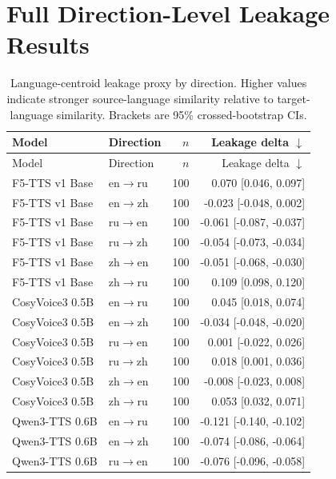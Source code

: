 \documentclass[11pt]{article}
\begin{document}
\FloatBarrier

\appendix

\section{Full Direction-Level Leakage Results}
\label{app:leakage_directions}

\begin{longtable}{llrr}
\caption{Language-centroid leakage proxy by direction. Higher values indicate stronger source-language similarity relative to target-language similarity. Brackets are 95\% crossed-bootstrap CIs.}
\label{tab:leakage_directions}\\
\toprule
Model & Direction & $n$ & Leakage delta $\downarrow$ \\
\midrule
\endfirsthead
\toprule
Model & Direction & $n$ & Leakage delta $\downarrow$ \\
\midrule
\endhead
F5-TTS v1 Base & en$\rightarrow$ru & 100 & 0.070 [0.046, 0.097] \\
F5-TTS v1 Base & en$\rightarrow$zh & 100 & -0.023 [-0.048, 0.002] \\
F5-TTS v1 Base & ru$\rightarrow$en & 100 & -0.061 [-0.087, -0.037] \\
F5-TTS v1 Base & ru$\rightarrow$zh & 100 & -0.054 [-0.073, -0.034] \\
F5-TTS v1 Base & zh$\rightarrow$en & 100 & -0.051 [-0.068, -0.030] \\
F5-TTS v1 Base & zh$\rightarrow$ru & 100 & 0.109 [0.098, 0.120] \\
CosyVoice3 0.5B & en$\rightarrow$ru & 100 & 0.045 [0.018, 0.074] \\
CosyVoice3 0.5B & en$\rightarrow$zh & 100 & -0.034 [-0.048, -0.020] \\
CosyVoice3 0.5B & ru$\rightarrow$en & 100 & 0.001 [-0.022, 0.026] \\
CosyVoice3 0.5B & ru$\rightarrow$zh & 100 & 0.018 [0.001, 0.036] \\
CosyVoice3 0.5B & zh$\rightarrow$en & 100 & -0.008 [-0.023, 0.008] \\
CosyVoice3 0.5B & zh$\rightarrow$ru & 100 & 0.053 [0.032, 0.071] \\
Qwen3-TTS 0.6B & en$\rightarrow$ru & 100 & -0.121 [-0.140, -0.102] \\
Qwen3-TTS 0.6B & en$\rightarrow$zh & 100 & -0.074 [-0.086, -0.064] \\
Qwen3-TTS 0.6B & ru$\rightarrow$en & 100 & -0.076 [-0.096, -0.058] \\

\end{longtable}
\end{document}

